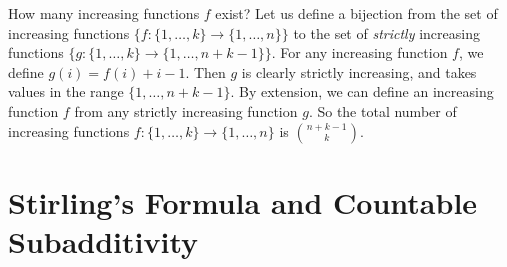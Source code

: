 \documentclass{article}
\begin{document}
How many increasing functions $f$ exist? Let us define a bijection from the set of increasing functions $\{f\colon \{1, \dots, k\} \to \{1, \dots, n\}\}$ to the set of \textit{strictly} increasing functions $\{g\colon \{1, \dots, k\} \to \{1, \dots, n+k-1\}\}$. For any increasing function $f$, we define $g(i) = f(i) + i - 1$. Then $g$ is clearly strictly increasing, and takes values in the range $\{1, \dots, n+k-1\}$. By extension, we can define an increasing function $f$ from any strictly increasing function $g$. So the total number of increasing functions $f\colon \{1, \dots, k\} \to \{1, \dots, n\}$ is $\binom{n+k-1}{k}$.

\section{Stirling's Formula and Countable Subadditivity}
\end{document}

